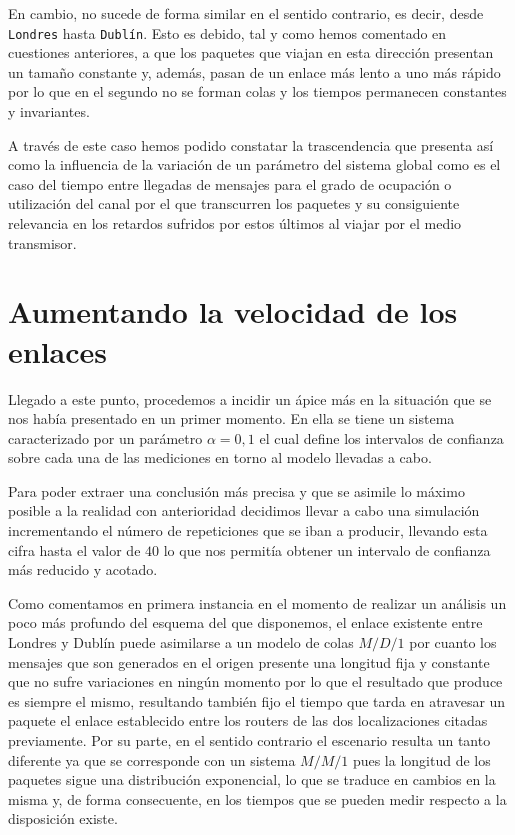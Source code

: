 \documentclass{article}[10pt]
\begin{document}
		En cambio, no sucede de forma similar en el sentido contrario, es decir, desde \texttt{Londres} hasta \texttt{Dublín}. Esto es debido, tal y como hemos comentado en cuestiones anteriores, a que los paquetes que viajan en esta dirección presentan un tamaño constante y, además, pasan de un enlace más lento a uno más rápido por lo que en el segundo no se forman colas y los tiempos permanecen constantes y invariantes.

		A través de este caso hemos podido constatar la trascendencia que presenta así como la influencia de la variación de un parámetro del sistema global como es el caso del tiempo entre llegadas de mensajes para el grado de ocupación o utilización del canal por el que transcurren los paquetes y su consiguiente relevancia en los retardos sufridos por estos últimos al viajar por el medio transmisor.

	\section{Aumentando la velocidad de los enlaces}
		Llegado a este punto, procedemos a incidir un ápice más en la situación que se nos había presentado en un primer momento. En ella se tiene un sistema caracterizado por un parámetro $\alpha = 0,1$ el cual define los intervalos de confianza sobre cada una de las mediciones en torno al modelo llevadas a cabo.

		Para poder extraer una conclusión más precisa y que se asimile lo máximo posible a la realidad con anterioridad decidimos llevar a cabo una simulación incrementando el número de repeticiones que se iban a producir, llevando esta cifra hasta el valor de $40$ lo que nos permitía obtener un intervalo de confianza más reducido y acotado.

		Como comentamos en primera instancia en el momento de realizar un análisis un poco más profundo del esquema del que disponemos, el enlace existente entre Londres y Dublín puede asimilarse a un modelo de colas $M/D/1$ por cuanto los mensajes que son generados en el origen presente una longitud fija y constante que no sufre variaciones en ningún momento por lo que el resultado que produce es siempre el mismo, resultando también fijo el tiempo que tarda en atravesar un paquete el enlace establecido entre los routers de las dos localizaciones citadas previamente. Por su parte, en el sentido contrario el escenario resulta un tanto diferente ya que se corresponde con un sistema $M/M/1$ pues la longitud de los paquetes sigue una distribución exponencial, lo que se traduce en cambios en la misma y, de forma consecuente, en los tiempos que se pueden medir respecto a la disposición existe.
\end{document}
